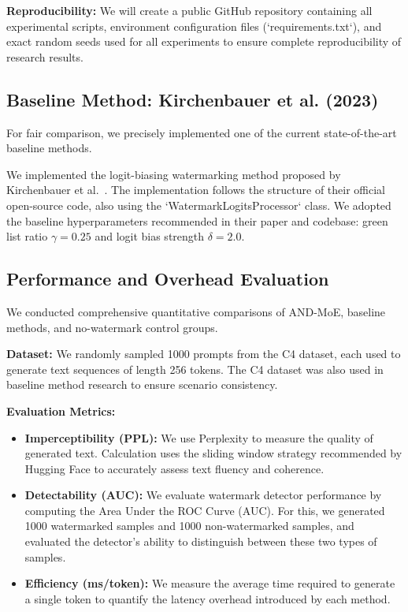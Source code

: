 \documentclass[letterpaper,twocolumn,10pt]{article}
\begin{document}
\textbf{Reproducibility:} We will create a public GitHub repository containing all experimental scripts, environment configuration files (`requirements.txt`), and exact random seeds used for all experiments to ensure complete reproducibility of research results.

\subsection{Baseline Method: Kirchenbauer et al. (2023)}

For fair comparison, we precisely implemented one of the current state-of-the-art baseline methods.

We implemented the logit-biasing watermarking method proposed by Kirchenbauer et al.~\cite{kirchenbauer2023watermark}. The implementation follows the structure of their official open-source code, also using the `WatermarkLogitsProcessor` class. We adopted the baseline hyperparameters recommended in their paper and codebase: green list ratio $\gamma=0.25$ and logit bias strength $\delta=2.0$.

\subsection{Performance and Overhead Evaluation}

We conducted comprehensive quantitative comparisons of AND-MoE, baseline methods, and no-watermark control groups.

\textbf{Dataset:} We randomly sampled 1000 prompts from the C4 dataset, each used to generate text sequences of length 256 tokens. The C4 dataset was also used in baseline method research to ensure scenario consistency.

\textbf{Evaluation Metrics:}

\begin{itemize}
\item \textbf{Imperceptibility (PPL):} We use Perplexity to measure the quality of generated text. Calculation uses the sliding window strategy recommended by Hugging Face to accurately assess text fluency and coherence.
\item \textbf{Detectability (AUC):} We evaluate watermark detector performance by computing the Area Under the ROC Curve (AUC). For this, we generated 1000 watermarked samples and 1000 non-watermarked samples, and evaluated the detector's ability to distinguish between these two types of samples.
\item \textbf{Efficiency (ms/token):} We measure the average time required to generate a single token to quantify the latency overhead introduced by each method.
\end{itemize}
\end{document}
